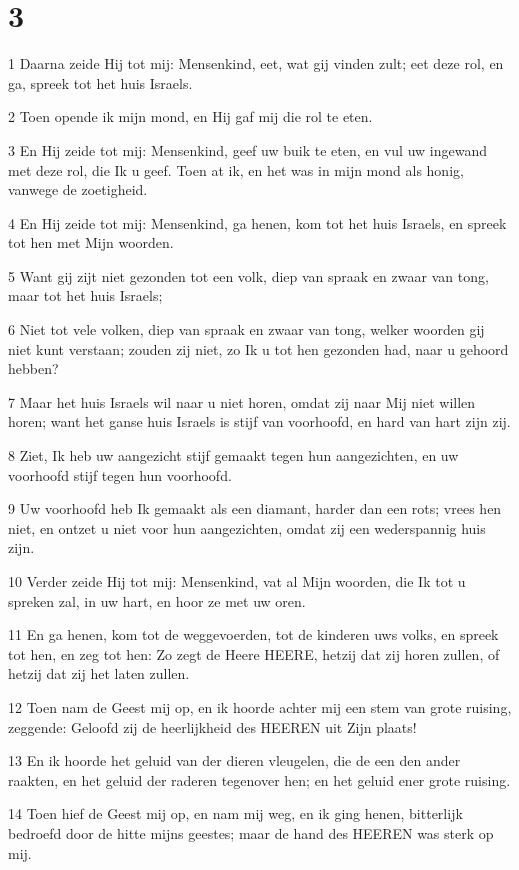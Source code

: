 \chapter{3}

\par 1 Daarna zeide Hij tot mij: Mensenkind, eet, wat gij vinden zult; eet deze rol, en ga, spreek tot het huis Israels.
\par 2 Toen opende ik mijn mond, en Hij gaf mij die rol te eten.
\par 3 En Hij zeide tot mij: Mensenkind, geef uw buik te eten, en vul uw ingewand met deze rol, die Ik u geef. Toen at ik, en het was in mijn mond als honig, vanwege de zoetigheid.
\par 4 En Hij zeide tot mij: Mensenkind, ga henen, kom tot het huis Israels, en spreek tot hen met Mijn woorden.
\par 5 Want gij zijt niet gezonden tot een volk, diep van spraak en zwaar van tong, maar tot het huis Israels;
\par 6 Niet tot vele volken, diep van spraak en zwaar van tong, welker woorden gij niet kunt verstaan; zouden zij niet, zo Ik u tot hen gezonden had, naar u gehoord hebben?
\par 7 Maar het huis Israels wil naar u niet horen, omdat zij naar Mij niet willen horen; want het ganse huis Israels is stijf van voorhoofd, en hard van hart zijn zij.
\par 8 Ziet, Ik heb uw aangezicht stijf gemaakt tegen hun aangezichten, en uw voorhoofd stijf tegen hun voorhoofd.
\par 9 Uw voorhoofd heb Ik gemaakt als een diamant, harder dan een rots; vrees hen niet, en ontzet u niet voor hun aangezichten, omdat zij een wederspannig huis zijn.
\par 10 Verder zeide Hij tot mij: Mensenkind, vat al Mijn woorden, die Ik tot u spreken zal, in uw hart, en hoor ze met uw oren.
\par 11 En ga henen, kom tot de weggevoerden, tot de kinderen uws volks, en spreek tot hen, en zeg tot hen: Zo zegt de Heere HEERE, hetzij dat zij horen zullen, of hetzij dat zij het laten zullen.
\par 12 Toen nam de Geest mij op, en ik hoorde achter mij een stem van grote ruising, zeggende: Geloofd zij de heerlijkheid des HEEREN uit Zijn plaats!
\par 13 En ik hoorde het geluid van der dieren vleugelen, die de een den ander raakten, en het geluid der raderen tegenover hen; en het geluid ener grote ruising.
\par 14 Toen hief de Geest mij op, en nam mij weg, en ik ging henen, bitterlijk bedroefd door de hitte mijns geestes; maar de hand des HEEREN was sterk op mij.
